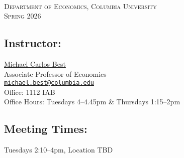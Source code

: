 \documentclass[11pt]{article}
\begin{document}


 \\
\textsc{Department of Economics, Columbia University} \\
\textsc{Spring 2026}

\subsection*{Instructor:}
\href{http://www.columbia.edu/~mcb2270/}{Michael Carlos Best} \\
Associate Professor of Economics \\
\href{mailto:michael.best@columbia.edu}{\nolinkurl{michael.best@columbia.edu}} \\
Office: 1112 IAB \\
Office Hours: Tuesdays 4--4.45pm \& Thursdays 1:15--2pm

\subsection*{Meeting Times:}
Tuesdays 2:10--4pm, Location TBD
\end{document}
